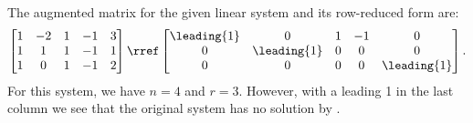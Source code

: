 The augmented matrix for the given linear system and its row-reduced form are:
\begin{align*}
\begin{bmatrix}
1 & -2 & 1 & -1 & 3\\
1 & 1 & 1 & -1 & 1\\
1 & 0 & 1 & -1 & 2
\end{bmatrix}
\rref
\begin{bmatrix}
\leading{1} & 0 & 1 & -1 & 0\\
0 & \leading{1} & 0 & 0 & 0\\
0 & 0  & 0 & 0 & \leading{1} 
\end{bmatrix}.
\end{align*}
For this system, we have $n = 4$ and $r = 3$.  However, with a leading 1 in the last column we see that the original system has no solution by .

